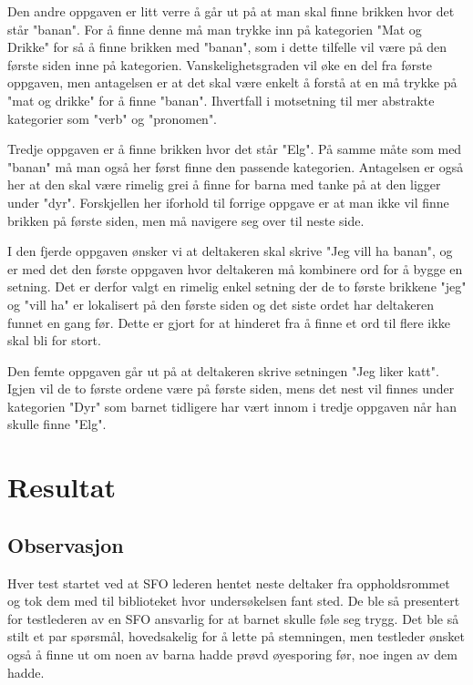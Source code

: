  
Den andre oppgaven er litt verre å går ut på at man skal finne brikken hvor det står "banan". For å finne denne må man trykke inn på kategorien "Mat og Drikke" for så å finne brikken med "banan", som i dette tilfelle vil være på den første siden inne på kategorien. Vanskelighetsgraden vil øke en del fra første oppgaven, men antagelsen er at det skal være enkelt å forstå at en må trykke på "mat og drikke" for å finne "banan". Ihvertfall i motsetning til mer abstrakte kategorier som "verb" og "pronomen". 
 
 
Tredje oppgaven er å finne brikken hvor det står "Elg". På samme måte som med "banan" må man også her først finne den passende kategorien. Antagelsen er også her at den skal være rimelig grei å finne for barna med tanke på at den ligger under "dyr". Forskjellen her iforhold til forrige oppgave er at man ikke vil finne brikken på første siden, men må navigere seg over til neste side. 
 
 
I den fjerde oppgaven ønsker vi at deltakeren skal skrive "Jeg vill ha banan", og er med det den første oppgaven hvor deltakeren må kombinere ord for å bygge en setning. Det er derfor valgt en rimelig enkel setning der de to første brikkene "jeg" og "vill ha" er lokalisert på den første siden og det siste ordet har deltakeren funnet en gang før. Dette er gjort for at hinderet fra å finne et ord til flere ikke skal bli for stort.  
 
 
Den femte oppgaven går ut på at deltakeren skrive setningen "Jeg liker katt". Igjen vil de to første ordene være på første siden, mens det nest vil finnes under kategorien "Dyr" som barnet tidligere har vært innom i tredje oppgaven når han skulle finne "Elg".  
 
 
\section{Resultat} 
 
 
\subsection{Observasjon} 
 
 
Hver test startet ved at SFO lederen hentet neste deltaker fra oppholdsrommet og tok dem med til biblioteket hvor undersøkelsen fant sted. De ble så presentert for testlederen av en SFO ansvarlig for at barnet skulle føle seg trygg. Det ble så stilt et par spørsmål, hovedsakelig for å lette på stemningen, men testleder ønsket også å finne ut om noen av barna hadde prøvd øyesporing før, noe ingen av dem hadde. 
 
